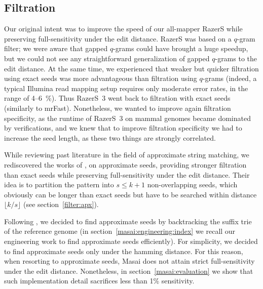 
\subsection{Filtration}
\label{masai:engineering:seeding}


Our original intent was to improve the speed of our all-mapper RazerS \citep{Weese2009} while preserving full-sensitivity under the edit distance.
RazerS was based on a $q$-gram filter;
we were aware that gapped $q$-grams could have brought a huge speedup, but we could not see any straightforward generalization of gapped $q$-grams to the edit distance.
At the same time, we experienced that weaker but quicker filtration using exact seeds was more advantageous than filtration using $q$-grams (indeed, a typical Illumina read mapping setup requires only moderate error rates, in the range of 4--6~\%).
Thus RazerS~3 \citep{RazerS3} went back to filtration with exact seeds (similarly to mrFast).
Nonetheless, we wanted to improve again filtration specificity, as the runtime of RazerS~3 on mammal genomes became dominated by verifications, and we knew that to improve filtration specificity we had to increase the seed length, as these two things are strongly correlated.

While reviewing past literature in the field of approximate string matching, we rediscovered the works of \citeauthor{Myers1994}, \citeauthor{Navarro2000} on approximate seeds, providing stronger filtration than exact seeds while preserving full-sensitivity under the edit distance.
Their idea is to partition the pattern into $s \leq k+1$ non-overlapping seeds, which obviously can be longer than exact seeds but have to be searched within distance $\lfloor k/s \rfloor$ (see section~\ref{filter:apx}).

Following \citep{Navarro2000}, we decided to find approximate seeds by backtracking the suffix trie of the reference genome (in section~\ref{masai:engineering:index} we recall our engineering work to find approximate seeds efficiently).
For simplicity, we decided to find approximate seeds only under the hamming distance.
For this reason, when resorting to approximate seeds, Masai does not attain strict full-sensitivity under the edit distance.
Nonetheless, in section~\ref{masai:evaluation} we show that such implementation detail sacrifices less than 1\% sensitivity.

